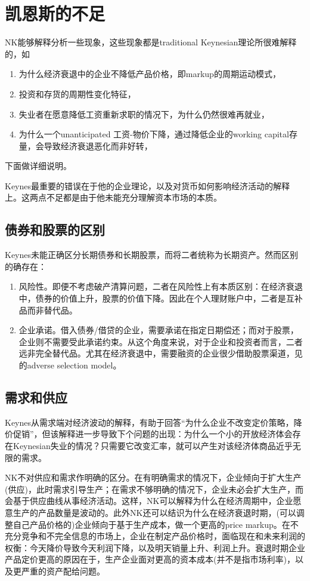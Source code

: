 \section{凯恩斯的不足}
\label{sec:KNK-K-errors}

NK能够解释分析一些现象，这些现象都是traditional Keynesian理论所很难解释的，如
\begin{enumerate}
\item 为什么经济衰退中的企业不降低产品价格，即markup的周期运动模式，
\item 投资和存货的周期性变化特征，
\item 失业者在愿意降低工资重新求职的情况下，为什么仍然很难再就业，
\item 为什么一个unanticipated 工资-物价下降，通过降低企业的working capital存量，会导致经济衰退恶化而非好转，
\end{enumerate}
下面做详细说明。

Keynes最重要的错误在于他的企业理论，以及对货币如何影响经济活动的解释上。这两点不足都是由于他未能充分理解资本市场的本质。

\subsection{债券和股票的区别}
\label{sec:KNK-K-bond-equity}
Keynes未能正确区分长期债券和长期股票，而将二者统称为长期资产。然而区别的确存在：
\begin{enumerate}
\item 风险性。即便不考虑破产清算问题，二者在风险性上有本质区别：在经济衰退中，债券的价值上升，股票的价值下降。因此在个人理财账户中，二者是互补品而非替代品。
\item 企业承诺。借入债券/借贷的企业，需要承诺在指定日期偿还；而对于股票，企业则不需要受此承诺约束。从这个角度来说，对于企业和投资者而言，二者远非完全替代品。尤其在经济衰退中，需要融资的企业很少借助股票渠道，见\cite{Greenwald:1984uv}的adverse selection model。
\end{enumerate}

\subsection{需求和供应}
\label{sec:KNK-K-dem-supp}
Keynes从需求端对经济波动的解释，有助于回答“为什么企业不改变定价策略，降价促销”，但该解释进一步导致下个问题的出现：为什么一个小的开放经济体会存在Keynesian失业的情况？只需要它改变汇率，就可以产生对该经济体商品近乎无限的需求。

NK不对供应和需求作明确的区分。在有明确需求的情况下，企业倾向于扩大生产(供应)，此时需求引导生产；在需求不够明确的情况下，企业未必会扩大生产，而会基于供应曲线从事经济活动。这样，NK可以解释为什么在经济周期中，企业愿意生产的产品数量是波动的。此外NK还可以结识为什么在经济衰退时期，(可以调整自己产品价格的)企业倾向于基于生产成本，做一个更高的price markup。在不充分竞争和不完全信息的市场上，企业在制定产品价格时，面临现在和未来利润的权衡：今天降价导致今天利润下降，以及明天销量上升、利润上升。衰退时期企业产品定价更高的原因在于，生产企业面对更高的资本成本(并不是指市场利率)，以及更严重的资产配给问题。

